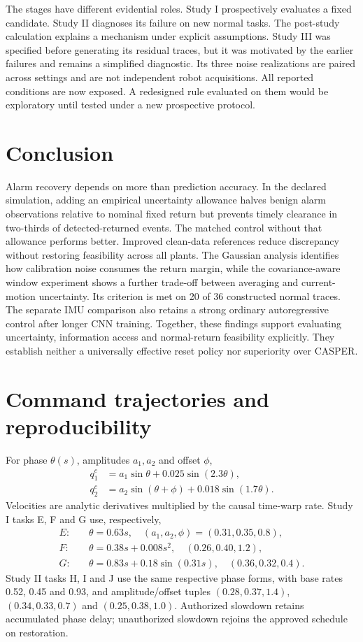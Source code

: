\documentclass[11pt]{article}
\begin{document}
The stages have different evidential roles. Study I prospectively evaluates a fixed candidate. Study II diagnoses its failure on new normal tasks. The post-study calculation explains a mechanism under explicit assumptions. Study III was specified before generating its residual traces, but it was motivated by the earlier failures and remains a simplified diagnostic. Its three noise realizations are paired across settings and are not independent robot acquisitions. All reported conditions are now exposed. A redesigned rule evaluated on them would be exploratory until tested under a new prospective protocol.

\section{Conclusion}
Alarm recovery depends on more than prediction accuracy. In the declared simulation, adding an empirical uncertainty allowance halves benign alarm observations relative to nominal fixed return but prevents timely clearance in two-thirds of detected-returned events. The matched control without that allowance performs better. Improved clean-data references reduce discrepancy without restoring feasibility across all plants. The Gaussian analysis identifies how calibration noise consumes the return margin, while the covariance-aware window experiment shows a further trade-off between averaging and current-motion uncertainty. Its criterion is met on 20 of 36 constructed normal traces. The separate IMU comparison also retains a strong ordinary autoregressive control after longer CNN training. Together, these findings support evaluating uncertainty, information access and normal-return feasibility explicitly. They establish neither a universally effective reset policy nor superiority over CASPER.

\appendix
\section{Command trajectories and reproducibility}
For phase $\theta(s)$, amplitudes $a_1,a_2$ and offset $\phi$,
\begin{align}
 q_1^c&=a_1\sin\theta+0.025\sin(2.3\theta),\\
 q_2^c&=a_2\sin(\theta+\phi)+0.018\sin(1.7\theta).
\end{align}
Velocities are analytic derivatives multiplied by the causal time-warp rate. Study I tasks E, F and G use, respectively,
\begin{align*}
 E:&\quad \theta=0.63s,\quad (a_1,a_2,\phi)=(0.31,0.35,0.8),\\
 F:&\quad \theta=0.38s+0.008s^2,\quad (0.26,0.40,1.2),\\
 G:&\quad \theta=0.83s+0.18\sin(0.31s),\quad (0.36,0.32,0.4).
\end{align*}
Study II tasks H, I and J use the same respective phase forms, with base rates 0.52, 0.45 and 0.93, and amplitude/offset tuples $(0.28,0.37,1.4)$, $(0.34,0.33,0.7)$ and $(0.25,0.38,1.0)$. Authorized slowdown retains accumulated phase delay; unauthorized slowdown rejoins the approved schedule on restoration.
\end{document}
